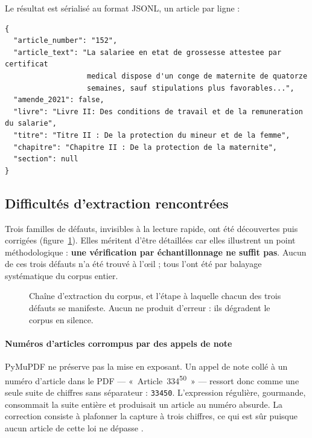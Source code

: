 Le résultat est sérialisé au format JSONL, un article par ligne :

\begin{lstlisting}[caption={Structure d'un article du corpus},label={lst:article}]
{
  "article_number": "152",
  "article_text": "La salariee en etat de grossesse attestee par certificat
                   medical dispose d'un conge de maternite de quatorze
                   semaines, sauf stipulations plus favorables...",
  "amende_2021": false,
  "livre": "Livre II: Des conditions de travail et de la remuneration du salarie",
  "titre": "Titre II : De la protection du mineur et de la femme",
  "chapitre": "Chapitre II : De la protection de la maternite",
  "section": null
}
\end{lstlisting}

\subsection{Difficultés d'extraction rencontrées}
\label{sec:bugs}

Trois familles de défauts, invisibles à la lecture rapide, ont été découvertes puis corrigées
(figure~\ref{fig:pipeline}). Elles méritent d'être détaillées car elles illustrent un point
méthodologique : \textbf{une vérification par échantillonnage ne suffit pas}. Aucun de ces trois
défauts n'a été trouvé à l'œil ; tous l'ont été par balayage systématique du corpus entier.

\begin{figure}[htbp]
  \centering
  
  \caption[Chaîne d'extraction et défauts rencontrés]{Chaîne d'extraction du corpus, et l'étape à
  laquelle chacun des trois défauts se manifeste. Aucun ne produit d'erreur : ils dégradent le
  corpus en silence.}
  \label{fig:pipeline}
\end{figure}

\paragraph{Numéros d'articles corrompus par des appels de note}
PyMuPDF ne préserve pas la mise en exposant. Un appel de note collé à un numéro d'article dans le
PDF --- «~Article~334\textsuperscript{50}~» --- ressort donc comme une seule suite de chiffres sans
séparateur : \texttt{33450}. L'expression régulière, gourmande, consommait la suite entière et
produisait un article au numéro absurde. La correction consiste à plafonner la capture à trois
chiffres, ce qui est sûr puisque aucun article de cette loi ne dépasse \NbArticles{}.

